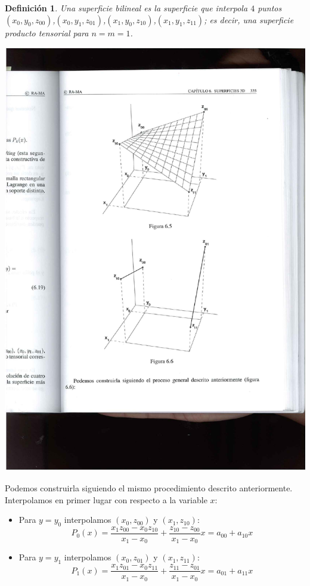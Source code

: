 \documentclass[ebook,oneside]{memoir}
\newtheorem{defn}[thm]{Definición}
\begin{document}
\begin{defn}
Una superficie bilineal es la superficie que interpola $4$ puntos $(x_0,y_0,z_{00})$,\;$(x_0,y_1,z_{01})$,\;$(x_1,y_0,z_{10})$,\;$(x_1,y_1,z_{11})$; es decir, una superficie producto tensorial para $n=m=1$.
\end{defn}

\begin{center}
\includegraphics[scale=0.45]{6_5.pdf}
\end{center}

Podemos construirla siguiendo el mismo procedimiento descrito anteriormente. Interpolamos en primer lugar con respecto a la variable $x$:
\begin{itemize}
\item Para $y=y_0$ interpolamos $(x_0,z_{00})$ y $(x_1,z_{10})$:
$$P_0(x)=\frac{x_1 z_{00}-x_0 z_{10}}{x_1-x_0}+\frac{z_{10}-z_{00}}{x_1-x_0}x=a_{00}+a_{10}x$$
\item Para $y=y_1$ interpolamos $(x_0,z_{01})$ y $(x_1,z_{11})$:
$$P_1(x)=\frac{x_1 z_{01}-x_0 z_{11}}{x_1-x_0}+\frac{z_{11}-z_{01}}{x_1-x_0}x=a_{01}+a_{11}x$$
\end{itemize}
\end{document}
